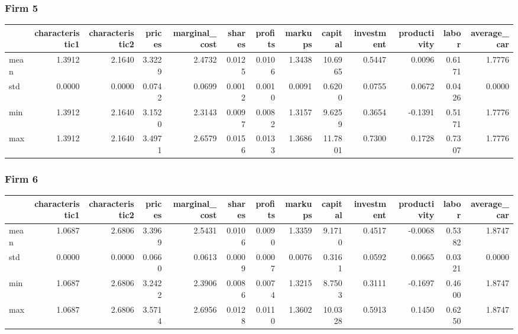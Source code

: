  \subsubsection*{Firm 5}
\begin{tabular}{lrrrrrrrrrrrr}
\toprule
{} &  characteristic1 &  characteristic2 &  prices &  marginal\_cost &  shares &  profits &  markups &  capital &  investment &  productivity &  labor &  average\_car \\
\midrule
mean &           1.3912 &           2.1640 &  3.3229 &         2.4732 &  0.0125 &   0.0106 &   1.3438 &  10.6965 &      0.5447 &        0.0096 & 0.6171 &       1.7776 \\
std  &           0.0000 &           0.0000 &  0.0742 &         0.0699 &  0.0012 &   0.0010 &   0.0091 &   0.6200 &      0.0755 &        0.0672 & 0.0426 &       0.0000 \\
min  &           1.3912 &           2.1640 &  3.1520 &         2.3143 &  0.0097 &   0.0082 &   1.3157 &   9.6259 &      0.3654 &       -0.1391 & 0.5171 &       1.7776 \\
max  &           1.3912 &           2.1640 &  3.4971 &         2.6579 &  0.0156 &   0.0133 &   1.3686 &  11.7801 &      0.7300 &        0.1728 & 0.7307 &       1.7776 \\
\bottomrule
\end{tabular}


 \subsubsection*{Firm 6}
\begin{tabular}{lrrrrrrrrrrrr}
\toprule
{} &  characteristic1 &  characteristic2 &  prices &  marginal\_cost &  shares &  profits &  markups &  capital &  investment &  productivity &  labor &  average\_car \\
\midrule
mean &           1.0687 &           2.6806 &  3.3969 &         2.5431 &  0.0106 &   0.0090 &   1.3359 &   9.1710 &      0.4517 &       -0.0068 & 0.5382 &       1.8747 \\
std  &           0.0000 &           0.0000 &  0.0660 &         0.0613 &  0.0009 &   0.0007 &   0.0076 &   0.3161 &      0.0592 &        0.0665 & 0.0321 &       0.0000 \\
min  &           1.0687 &           2.6806 &  3.2422 &         2.3906 &  0.0086 &   0.0074 &   1.3215 &   8.7503 &      0.3111 &       -0.1697 & 0.4600 &       1.8747 \\
max  &           1.0687 &           2.6806 &  3.5714 &         2.6956 &  0.0128 &   0.0110 &   1.3602 &  10.0328 &      0.5913 &        0.1450 & 0.6250 &       1.8747 \\
\bottomrule
\end{tabular}


